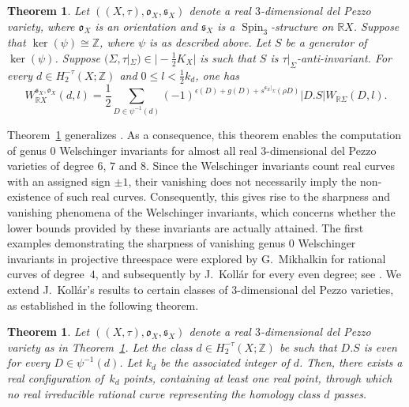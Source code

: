 \documentclass[11pt]{amsart}
\numberwithin{equation}{section}
\theoremstyle{definition}
\theoremstyle{plain}
\newtheorem{theorem}[definition]{Theorem}
\theoremstyle{remark}
\newcommand{\R}{\mathbb{R}}
\newcommand{\Z}{\mathbb{Z}}
\DeclareMathOperator{\Spin}{Spin}
\begin{document}
\begin{theorem}\label{Theorem2-W}
Let $((X,\tau),\mathfrak{o}_X,\mathfrak{s}_X)$ denote a real $3$-dimensional del Pezzo variety, where  $\mathfrak{o}_X$ is an orientation and $\mathfrak{s}_X$ is a $\Spin_3$-structure on $\R X$. Suppose that $\ker(\psi) \cong \Z$, where $\psi$ is as described above. Let $S$ be a generator of\, $\ker(\psi)$.  Suppose $(\Sigma,\tau|_{\Sigma})\in |-\frac{1}{2}K_X|$ is  such that $S$ is $\tau|_{\Sigma}$-anti-invariant.  For every $d\in H_2^{-\tau}(X;\Z)$ and $0\leq l< \frac{1}{2}k_d$,  one has
$$W^{\mathfrak{s}_X,\mathfrak{o}_X}_{\R X}(d,l)=\frac{1}{2}\sum_{D\in \psi^{-1}(d)}(-1)^{\epsilon(D)+g(D)+s^{\mathfrak{s}_X|_\Sigma}(\rho D)} |D.S| W_{\R \Sigma} (D,l).$$
\end{theorem}


Theorem~\ref{Theorem2-W} generalizes \cite[Theorem 1]{brugalle2016pencils}. As a consequence, this theorem enables the computation of  genus $0$ Welschinger invariants for almost all real $3$-dimensional del Pezzo varieties of degree $6$, $7$ and $8$. Since the Welschinger invariants count real curves with an assigned sign  $\pm 1$,  their vanishing does not necessarily imply the non-existence of such real curves. Consequently, this gives rise to the sharpness and vanishing phenomena of the Welschinger invariants, which concerns whether the lower bounds provided by these invariants are actually attained. The first examples demonstrating the sharpness of vanishing genus $0$ Welschinger invariants
in projective threespace were explored by G.~Mikhalkin for rational curves of degree~$4$, and subsequently by J.~Koll\'ar for every even degree; see \cite{kollar2015examples}. We extend J.~Koll\'ar's results to certain classes of $3$-dimensional del Pezzo varieties, as established in the following theorem.


\begin{theorem}\label{Theorem3-W}
Let $((X,\tau),\mathfrak{o}_X,\mathfrak{s}_X)$ denote a real $3$-dimensional del Pezzo variety as in Theorem~\ref{Theorem2-W}. Let the class $d\in H_2^{-\tau}(X;\Z)$ be  such that $D.S$ is even for every $D\in \psi^{-1}(d)$. Let $k_d$ be the associated integer of $d$. Then, there exists a real configuration of\, $k_d$ points, containing at least one real point, through which no real irreducible rational curve representing the homology class $d$ passes.
\end{theorem}
\end{document}
